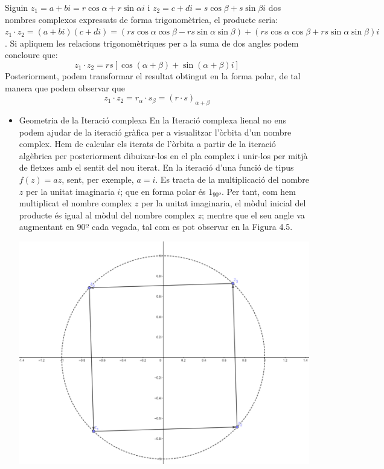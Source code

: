 \documentclass[12pt]{report}
\begin{document}
Siguin $z_1= a+bi= r\cos{\alpha}+ r\sin{\alpha}i$ i $z_2=c+di= s\cos{\beta}+s\sin{\beta}i$ dos nombres complexos expressats de forma trigonomètrica, el producte seria: $z_1 \cdot z_2 = (a+bi)(c+di) = (rs\cos{\alpha}\cos{\beta}-rs\sin{\alpha}\sin{\beta})+(rs\cos{\alpha}\cos{\beta}+rs\sin{\alpha}\sin{\beta})i$.
\newline
Si apliquem les relacions trigonomètriques per a la suma de dos angles podem concloure que: $$z_1\cdot z_2=rs[\cos({\alpha+\beta})+\sin({\alpha+\beta})i]$$
Posteriorment, podem transformar el resultat obtingut en la forma polar, de tal manera que podem observar que $$z_1\cdot z_2 = r_\alpha \cdot s_\beta = (r \cdot s)_{\alpha+\beta}$$
\begin{itemize}
    \item Geometria de la Iteració complexa
    \newline
    En la Iteració complexa lienal no ens podem ajudar de la iteració gràfica per a visualitzar l'òrbita d'un nombre complex. Hem de calcular els iterats de l'òrbita a partir de la iteració algèbrica per posteriorment dibuixar-los en el pla complex i unir-los per mitjà de fletxes amb el sentit del nou iterat.
    \newline
    \newline
   En la iteració d'una funció de tipus $f(z)=az$, sent, per exemple, $a=i$. Es tracta de la multiplicació del nombre $z$ per la unitat imaginaria $i$; que en forma polar és $1_{90º}$. Per tant, com hem multiplicat el nombre complex $z$ per la unitat imaginaria, el mòdul inicial del producte és igual al mòdul del nombre complex $z$; mentre que el seu angle va augmentant en $90º$ cada vegada, tal com es pot observar en la Figura 4.5.
   \begin{center}
   \includegraphics[width=0.8 \textwidth]{orbitaradi1.PNG}

\end{center}
\end{itemize}
\end{document}
